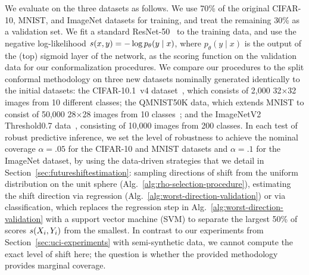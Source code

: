 We evaluate on the three datasets as follows.  We use 70\% of the
original CIFAR-10, MNIST, and ImageNet datasets for training, and treat the
remaining 30\% as a validation set.  We fit a standard
ResNet-50~\cite{HeZhReSu16} to the training data, and use the negative
log-likelihood $s(x, y) = -\log p_\theta(y \mid x)$, where $p_\theta(y
\mid x)$ is the output of the (top) sigmoid layer of the network, as the
scoring function on the validation data for our conformalization procedures.
We compare our procedures to the split conformal methodology on three new
datasets nominally generated identically to the initial datasets: the
CIFAR-10.1~v4 dataset~\cite{RechtRoScSh19}, which consists of 2,000 
32$\times$32 images from 10 different classes; the QMNIST50K data,
which extends MNIST to consist of 50,000 28$\times$28 images
from 10 classes~\cite{YadavBo19}; and the ImageNetV2 Threshold0.7
data~\cite{RechtRoScSh19}, consisting of 10,000 images from 200 classes.  In
each test of robust predictive inference, we set the level of robustness to achieve the nominal coverage $\alpha = .05$ for the CIFAR-10 and MNIST datasets and $\alpha = .1$ for the ImageNet dataset, by using the data-driven strategies that we detail in
Section~\ref{sec:futureshiftestimation}: sampling directions of shift from
the uniform distribution on the unit sphere
(Alg.~\ref{alg:rho-selection-procedure}), estimating the shift direction via
regression (Alg.~\ref{alg:worst-direction-validation}) or via
classification, which replaces the regression step in
Alg.~\ref{alg:worst-direction-validation} with a support vector machine
(SVM) to separate the largest 50\% of scores $s(X_i, Y_i)$ from the
smallest.
In contrast to our experiments from Section~\ref{sec:uci-experiments} with semi-synthetic data, we cannot compute the exact level of shift here; the
question is whether the provided methodology provides marginal coverage.

